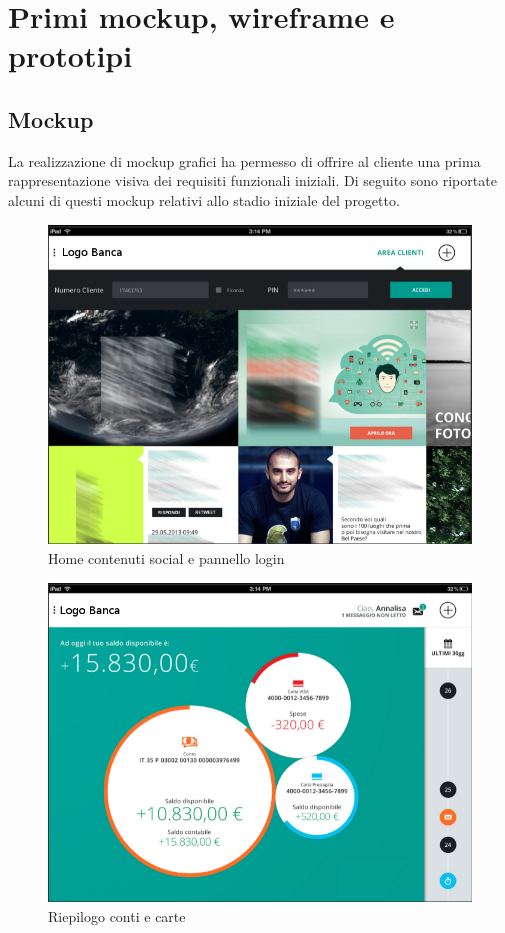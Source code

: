 \section{Primi mockup, wireframe e prototipi}
\subsection{Mockup}
La realizzazione di mockup grafici ha permesso di offrire al cliente una prima rappresentazione visiva dei requisiti funzionali iniziali. Di seguito sono riportate alcuni di questi mockup relativi allo stadio iniziale del progetto.

\begin{figure}[!htbp]
\centering
\includegraphics[scale=0.7]{immagini_mockup/home.png}
\caption{Home contenuti social e pannello login}
\end{figure}

\begin{figure}[!htbp]
\centering
\includegraphics[scale=0.7]{immagini_mockup/bolle.png}
\caption{Riepilogo conti e carte}
\end{figure}

